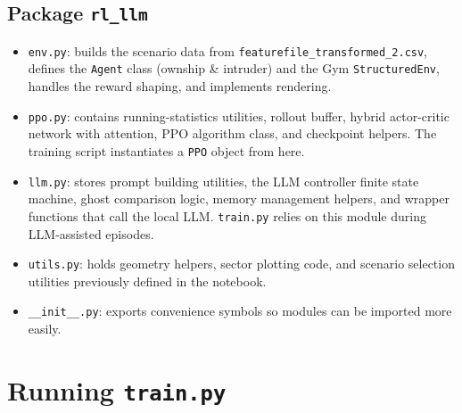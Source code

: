 \documentclass[12pt]{article}
\begin{document}
\subsection{Package \texttt{rl\_llm}}
\begin{itemize}[leftmargin=1.2cm]
  \item \texttt{env.py}: builds the scenario data from \texttt{featurefile\_transformed\_2.csv}, defines the \texttt{Agent} class (ownship \& intruder) and the Gym \texttt{StructuredEnv}, handles the reward shaping, and implements rendering.
  \item \texttt{ppo.py}: contains running-statistics utilities, rollout buffer, hybrid actor-critic network with attention, PPO algorithm class, and checkpoint helpers. The training script instantiates a \texttt{PPO} object from here.
  \item \texttt{llm.py}: stores prompt building utilities, the LLM controller finite state machine, ghost comparison logic, memory management helpers, and wrapper functions that call the local LLM. \texttt{train.py} relies on this module during LLM-assisted episodes.
  \item \texttt{utils.py}: holds geometry helpers, sector plotting code, and scenario selection utilities previously defined in the notebook.
  \item \texttt{\_\_init\_\_.py}: exports convenience symbols so modules can be imported more easily.
\end{itemize}

\section{Running \texttt{train.py}}
\end{document}
